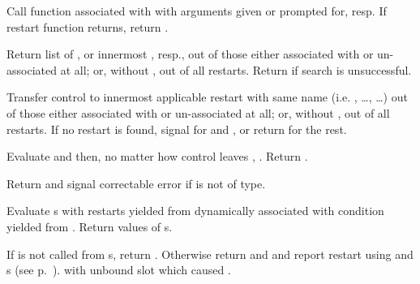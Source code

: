 \begin{LIST}{1cm}
  Call function associated with  with arguments given or
  prompted for, resp. If restart function returns, return .

  Return list of , or innermost 
  , resp., out of those either associated
  with  or un-associated at all; or, without
  , out of all restarts. Return \retval{\NIL} if search
  is unsuccessful.

  Transfer control to innermost applicable restart with same name
  (i.e. , \ldots,  \ldots) out of those either associated
  with  or un-associated at all; or, without
  , out of all restarts. If no restart is found,
  signal  for  and ,
  or return \retval{\NIL} for the rest.

  Evaluate  and then, no matter how control leaves , . Return .

   Return \retval{\NIL} and signal correctable error if  is not of {type}.

  Evaluate s with restarts yielded from 
  dynamically associated with  condition yielded from
  . Return values of s.

  If  is not called from s, return
  . Otherwise return \retval{\NIL}
  and \retval{\T} and report restart using  
  and s (see p.\ \pageref{section:Format}).
    with unbound slot which caused .


\end{LIST}

